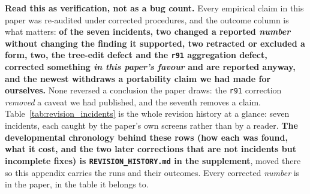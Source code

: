 \textbf{Read this as verification, not as a bug count.} Every empirical claim in this paper was re-audited under corrected procedures, and the outcome column is what matters: \textbf{of the seven incidents, two changed a reported \emph{number} without changing the finding it supported, two retracted or excluded a form, two, the tree-edit defect and the \texttt{r91} aggregation defect, corrected something \emph{in this paper's favour} and are reported anyway, and the newest withdraws a portability claim we had made for ourselves.} None reversed a conclusion the paper draws: the \texttt{r91} correction \emph{removed} a caveat we had published, and the seventh removes a claim. Table~\ref{tab:revision_incidents} is the whole revision history at a glance: seven incidents, each caught by the paper's own screens rather than by a reader. \textbf{The developmental chronology behind these rows (how each was found, what it cost, and the two later corrections that are not incidents but incomplete fixes) is \texttt{REVISION\_HISTORY.md} in the supplement}, moved there so this appendix carries the runs and their outcomes. Every corrected \emph{number} is in the paper, in the table it belongs to.

